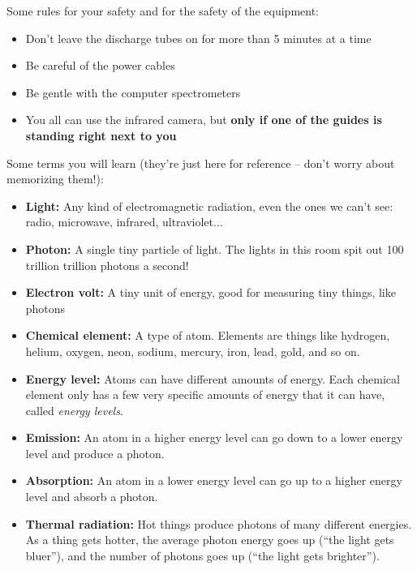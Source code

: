 \documentclass[12pt]{article}
\begin{document}
Some rules for your safety and for the safety of the equipment: 

\begin{itemize}
\item Don't leave the discharge tubes on for more than 5 minutes at a time
\item Be careful of the power cables
\item Be gentle with the computer spectrometers
\item You all can use the infrared camera, but {\bf only if one of the guides is standing right next to you}
\end{itemize}

\newpage

Some terms you will learn (they're just here for reference -- don't worry about memorizing them!):

\begin{itemize}
\item {\bf Light:} Any kind of electromagnetic radiation, even the ones we can't see: radio, microwave, infrared, ultraviolet...
\item {\bf Photon:} A single tiny particle of light. The lights in this room spit out 100 trillion trillion photons a second!
\item {\bf Electron volt:} A tiny unit of energy, good for measuring tiny things, like photons
\item {\bf Chemical element:} A type of atom. Elements are things like hydrogen, helium, oxygen, neon, sodium, mercury, iron, lead, gold, and so on.
\item {\bf Energy level:} Atoms can have different amounts of energy. Each chemical element only has a few very specific amounts of energy that it can have, called {\it energy levels}.
\item {\bf Emission:} An atom in a higher energy level can go down to a lower energy level and produce a photon.
\item {\bf Absorption:} An atom in a lower energy level can go up to a higher energy level and absorb a photon.
\item {\bf Thermal radiation:} Hot things produce photons of many different energies. As a thing gets hotter, the average photon
energy goes up (``the light gets bluer''), and the number of photons goes up (``the light gets brighter'').
\end{itemize}
\end{document}
